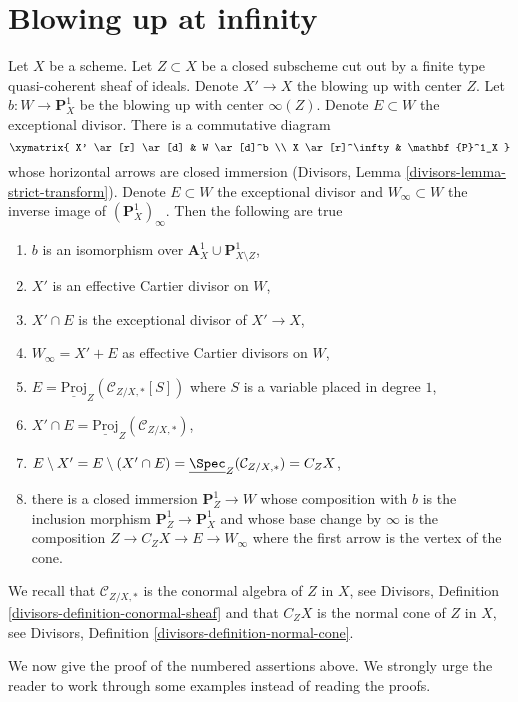 \section{Blowing up at infinity}
\label{section-blowup-Z-first}

\noindent
Let $X$ be a scheme. Let $Z \subset X$ be a closed subscheme cut out
by a finite type quasi-coherent sheaf of ideals. Denote $X' \to X$
the blowing up with center $Z$. Let $b : W \to \mathbf{P}^1_X$ be the
blowing up with center $\infty(Z)$. Denote $E \subset W$ the exceptional
divisor. There is a commutative diagram
$$
\xymatrix{
X' \ar[r] \ar[d] & W \ar[d]^b \\
X \ar[r]^\infty & \mathbf{P}^1_X
}
$$
whose horizontal arrows are closed immersion
(Divisors, Lemma \ref{divisors-lemma-strict-transform}). Denote $E \subset W$
the exceptional divisor and $W_\infty \subset W$ the inverse image
of $(\mathbf{P}^1_X)_\infty$. Then the following are true
\begin{enumerate}
\item $b$ is an isomorphism over
$\mathbf{A}^1_X \cup \mathbf{P}^1_{X \setminus Z}$,
\item $X'$ is an effective Cartier divisor on $W$,
\item $X' \cap E$ is the exceptional divisor of $X' \to X$,
\item $W_\infty = X' + E$ as effective Cartier divisors on $W$,
\item $E = \underline{\text{Proj}}_Z(\mathcal{C}_{Z/X, *}[S])$ where $S$
is a variable placed in degree $1$,
\item $X' \cap E = \underline{\text{Proj}}_Z(\mathcal{C}_{Z/X, *})$,
\item
\label{item-cone-is-open}
$E \setminus X' = E \setminus (X' \cap E) =
\underline{\Spec}_Z(\mathcal{C}_{Z/X, *}) = C_ZX$,
\item
\label{item-find-Z-in-blowup}
there is a closed immersion $\mathbf{P}^1_Z \to W$ whose
composition with $b$ is the inclusion morphism
$\mathbf{P}^1_Z \to \mathbf{P}^1_X$ and whose base change by $\infty$
is the composition $Z \to C_ZX \to E \to W_\infty$ where the first
arrow is the vertex of the cone.
\end{enumerate}
We recall that $\mathcal{C}_{Z/X, *}$ is the conormal algebra of $Z$ in $X$,
see Divisors, Definition \ref{divisors-definition-conormal-sheaf} and
that $C_ZX$ is the normal cone of $Z$ in $X$, see
Divisors, Definition \ref{divisors-definition-normal-cone}.

\medskip\noindent
We now give the proof of the numbered assertions above. We strongly
urge the reader to work through some examples instead of reading the
proofs.

